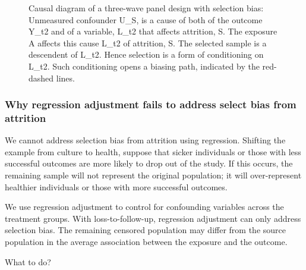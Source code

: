 \documentclass[
  singlecolumn]{article}
\begin{document}
\begin{figure}


\caption{\label{fig-dag-8-2}Causal diagram of a three-wave panel design
with selection bias: Unmeasured confounder U\_S, is a cause of both of
the outcome Y\_t2 and of a variable, L\_t2 that affects attrition, S.
The exposure A affects this cause L\_t2 of attrition, S. The selected
sample is a descendent of L\_t2. Hence selection is a form of
conditioning on L\_t2. Such conditioning opens a biasing path, indicated
by the red-dashed lines.}

\end{figure}%

\subsubsection{Why regression adjustment fails to address select bias
from
attrition}\label{why-regression-adjustment-fails-to-address-select-bias-from-attrition}

We cannot address selection bias from attrition using regression.
Shifting the example from culture to health, suppose that sicker
individuals or those with less successful outcomes are more likely to
drop out of the study. If this occurs, the remaining sample will not
represent the original population; it will over-represent healthier
individuals or those with more successful outcomes.

We use regression adjustment to control for confounding variables across
the treatment groups. With loss-to-follow-up, regression adjustment can
only address selection bias. The remaining censored population may
differ from the source population in the average association between the
exposure and the outcome.

What to do?
\end{document}
